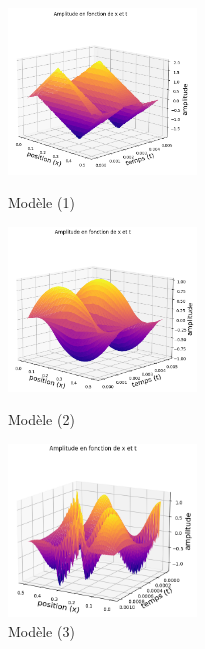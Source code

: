\begin{figure}[H]
  \includegraphics[width=5cm]{5.png}
  \caption{Modèle (1)}\label{fig}
\endminipage\hfill
{}
  \includegraphics[width=5cm]{6_pro.png}
  \caption{Modèle (2)}\label{fig}
\endminipage\hfill
{}%
  \includegraphics[width=5cm]{9_RK.png}
  \caption{Modèle (3)}\label{fig}
\endminipage
\end{figure}
